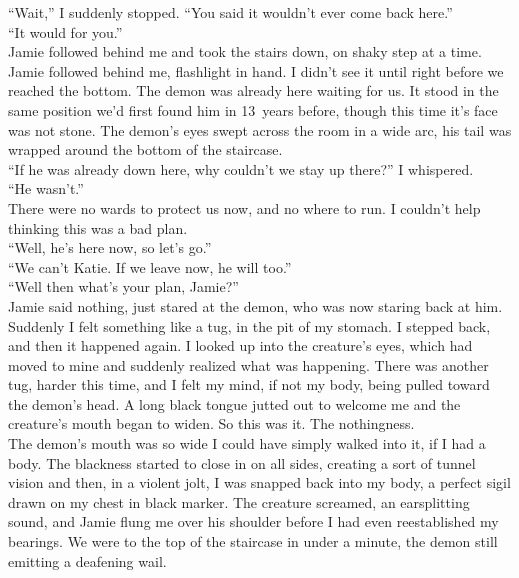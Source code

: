 \documentclass[a5paper]{scrartcl}
\begin{document}
\enquote{Wait,} I suddenly stopped. \enquote{You said it wouldn't ever come back here.}\\


\enquote{It would for you.} \\


Jamie followed behind me and took the stairs down, on shaky step at a time. Jamie followed behind me, flashlight in hand. I didn't see it until right before we reached the bottom. The demon was already here waiting for us. It stood in the same position we'd first found him in 13~years before, though this time it's face was not stone. The demon's eyes swept across the room in a wide arc, his tail was wrapped around the bottom of the staircase.\\


\enquote{If he was already down here, why couldn't we stay up there?} I whispered.\\


\enquote{He wasn't.}\\


There were no wards to protect us now, and no where to run. I couldn't help thinking this was a bad plan.\\


\enquote{Well, he's here now, so let's go.}\\


\enquote{We can't Katie. If we leave now, he will too.}\\


\enquote{Well then what's your plan, Jamie?}\\


Jamie said nothing, just stared at the demon, who was now staring back at him. Suddenly I felt something like a tug, in the pit of my stomach. I stepped back, and then it happened again. I looked up into the creature's eyes, which had moved to mine and suddenly realized what was happening. There was another tug, harder this time, and I felt my mind, if not my body, being pulled toward the demon's head. A long black tongue jutted out to welcome me and the creature's mouth began to widen. So this was it. The nothingness.\\


The demon's mouth was so wide I could have simply walked into it, if I had a body. The blackness started to close in on all sides, creating a sort of tunnel vision and then, in a violent jolt, I was snapped back into my body, a perfect sigil drawn on my chest in black marker. The creature screamed, an earsplitting sound, and Jamie flung me over his shoulder before I had even reestablished my bearings. We were to the top of the staircase in under a minute, the demon still emitting a deafening wail. \\
\end{document}
